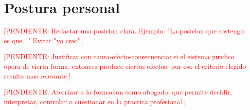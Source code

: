 \documentclass[
	spanish,
	letterpaper, oneside
]{article}
\newcommand{\pendiente}[1]{\textcolor{red}{[PENDIENTE: #1]}}
\begin{document}
%
%

\section{Postura personal}

\pendiente{Redactar una posicion clara. Ejemplo: "La posicion que sostengo es que..." Evitar "yo creo".}

\pendiente{Justificar con causa-efecto-consecuencia: si el sistema juridico opera de cierta forma, entonces produce ciertos efectos; por eso el criterio elegido resulta mas relevante.}

\pendiente{Aterrizar a la formacion como abogado: que permite decidir, interpretar, controlar o cuestionar en la practica profesional.}

%
\end{document}
